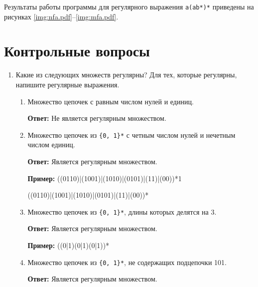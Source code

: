 Результаты работы программы для регулярного выражения \texttt{a(ab*)*} приведены на рисунках \ref{img:nfa.pdf}--\ref{img:mfa.pdf}.




\clearpage
\section{Контрольные вопросы}

\begin{enumerate}
  \item Какие из следующих множеств регулярны? Для тех, которые регулярны, напишите регулярные выражения.
  \begin{enumerate}
      \item Множество цепочек с равным числом нулей и единиц.
      
      \textbf{Ответ:} Не является регулярным множеством.

      \item Множество цепочек из \texttt{\{0, 1\}*} с четным числом нулей и нечетным числом единиц.
      
      \textbf{Ответ:} Является регулярным множеством. 

      \textbf{Пример:} ((0110)|(1001)|(1010)|(0101)|(11)|(00))*1
      
      ((0110)|(1001)|(1010)|(0101)|(11)|(00))*

      \item Множество цепочек из \texttt{\{0, 1\}*}, длины которых делятся на 3.
      
      \textbf{Ответ:} Является регулярным множеством. 

      \textbf{Пример:} ((0|1)(0|1)(0|1))*

      \item Множество цепочек из \texttt{\{0, 1\}*}, не содержащих подцепочки 101.
      
      \textbf{Ответ:} Является регулярным множеством. 


\end{enumerate}
\end{enumerate}
